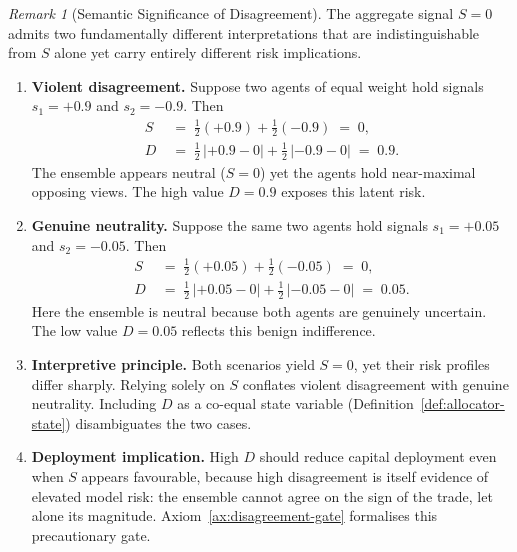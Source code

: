 \documentclass[12pt,openany]{book}
\numberwithin{equation}{chapter}
\theoremstyle{plain}
\theoremstyle{definition}
\theoremstyle{remark}
\newtheorem{remark}[theorem]{Remark}
\numberwithin{equation}{chapter}
\theoremstyle{plain}
\begin{document}
\begin{remark}[Semantic Significance of Disagreement]
\label{rem:disagreement-semantic}
The aggregate signal $S = 0$ admits two fundamentally different
interpretations that are indistinguishable from $S$ alone yet carry
entirely different risk implications.

\begin{enumerate}
  \item \textbf{Violent disagreement.}
        Suppose two agents of equal weight hold signals
        $s_1 = +0.9$ and $s_2 = -0.9$.  Then
        \begin{align}
          S
          &\;=\; \tfrac{1}{2}(+0.9) + \tfrac{1}{2}(-0.9)
           \;=\; 0,\\
          D
          &\;=\; \tfrac{1}{2}\,|{+0.9} - 0|
               + \tfrac{1}{2}\,|{-0.9} - 0|
           \;=\; 0.9.
        \end{align}
        The ensemble appears neutral ($S = 0$) yet the agents
        hold near-maximal opposing views.  The high value
        $D = 0.9$ exposes this latent risk.

  \item \textbf{Genuine neutrality.}
        Suppose the same two agents hold signals
        $s_1 = +0.05$ and $s_2 = -0.05$.  Then
        \begin{align}
          S
          &\;=\; \tfrac{1}{2}(+0.05) + \tfrac{1}{2}(-0.05)
           \;=\; 0,\\
          D
          &\;=\; \tfrac{1}{2}\,|{+0.05} - 0|
               + \tfrac{1}{2}\,|{-0.05} - 0|
           \;=\; 0.05.
        \end{align}
        Here the ensemble is neutral because both agents are
        genuinely uncertain.  The low value $D = 0.05$
        reflects this benign indifference.

  \item \textbf{Interpretive principle.}
        Both scenarios yield $S = 0$, yet their risk
        profiles differ sharply.  Relying solely on $S$
        conflates violent disagreement with genuine
        neutrality.  Including $D$ as a co-equal state
        variable (Definition~\ref{def:allocator-state})
        disambiguates the two cases.

  \item \textbf{Deployment implication.}
        High $D$ should reduce capital deployment even when
        $S$ appears favourable, because high disagreement
        is itself evidence of elevated model risk: the
        ensemble cannot agree on the sign of the trade,
        let alone its magnitude.
        Axiom~\ref{ax:disagreement-gate} formalises this
        precautionary gate.


\end{enumerate}
\end{remark}
\end{document}
